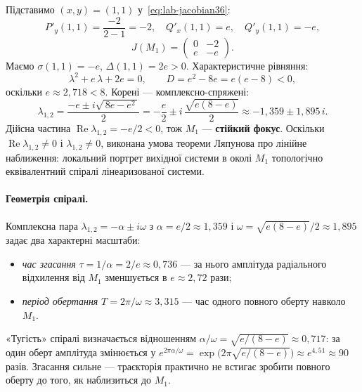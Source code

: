 Підставимо $(x,y)=(1,1)$ у~\eqref{eq:lab-jacobian36}:
\begin{equation*}
P'_y(1,1)=\dfrac{-2}{2-1}=-2,\quad Q'_x(1,1)=e,\quad Q'_y(1,1)=-e,
\end{equation*}
\begin{equation*}
J(M_1)=
\begin{pmatrix}
0 & -2\\
e & -e
\end{pmatrix}.
\end{equation*}
Маємо $\sigma(1,1)=-e$, $\Delta(1,1)=2e>0$. Характеристичне рівняння:
\begin{equation*}
\lambda^2+e\,\lambda+2e=0,\qquad D=e^2-8e=e(e-8)<0,
\end{equation*}
оскільки $e\approx 2{,}718<8$. Корені --- комплексно-спряжені:
\begin{equation*}
\lambda_{1,2}=\dfrac{-e\pm i\sqrt{\,8e-e^2\,}}{2}
=-\dfrac{e}{2}\pm i\,\dfrac{\sqrt{e(8-e)}}{2}
\approx -1{,}359\pm 1{,}895\,i.
\end{equation*}
Дійсна частина $\operatorname{Re}\lambda_{1,2}=-e/2<0$, тож $M_1$ --- \textbf{стійкий фокус}.
Оскільки $\operatorname{Re}\lambda_{1,2}\neq 0$ і $\lambda_{1,2}\neq 0$, виконана умова теореми Ляпунова про лінійне наближення: локальний портрет вихідної системи в околі $M_1$ топологічно еквівалентний спіралі лінеаризованої системи.

\paragraph{Геометрія спіралі.}
Комплексна пара $\lambda_{1,2}=-\alpha\pm i\omega$ з $\alpha=e/2\approx 1{,}359$ і $\omega=\sqrt{e(8-e)}/2\approx 1{,}895$ задає два характерні масштаби:
\begin{itemize}
    \item \emph{час згасання} $\tau=1/\alpha=2/e\approx 0{,}736$ --- за нього амплітуда радіального відхилення від $M_1$ зменшується в $e\approx 2{,}72$ рази;
    \item \emph{період обертання} $T=2\pi/\omega\approx 3{,}315$ --- час одного повного оберту навколо $M_1$.
\end{itemize}
«Тугість» спіралі визначається відношенням $\alpha/\omega=\sqrt{e/(8-e)}\approx 0{,}717$: за один оберт амплітуда змінюється у $e^{2\pi\alpha/\omega}=\exp\!\bigl(2\pi\sqrt{e/(8-e)}\bigr)\approx e^{4{,}51}\approx 90$ разів. Згасання сильне --- траєкторія практично не встигає зробити повного оберту до того, як наблизиться до $M_1$.

